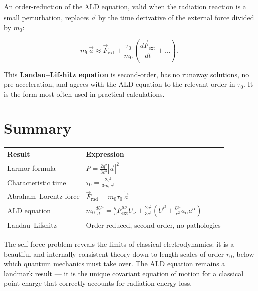 An order-reduction of the ALD equation, valid when the radiation reaction is a small perturbation, replaces $\dot{\vec{a}}$ by the time derivative of the external force divided by $m_0$:

\begin{equation}
m_0\vec{a} \approx \vec{F}_{\text{ext}} + \frac{\tau_0}{m_0}\!\left(\frac{d\vec{F}_{\text{ext}}}{dt} + \ldots\right).
\end{equation}

This \textbf{Landau--Lifshitz equation} is second-order, has no runaway solutions, no pre-acceleration, and agrees with the ALD equation to the relevant order in $\tau_0$. It is the form most often used in practical calculations.

\section{Summary}

\begin{table}[h]
\centering
\renewcommand{\arraystretch}{1.5}
\begin{tabular}{ll}
\toprule
\textbf{Result} & \textbf{Expression} \\
\midrule
Larmor formula & $P = \frac{2q^2}{3c^3}|\vec{a}|^2$ \\
Characteristic time & $\tau_0 = \frac{2q^2}{3m_0 c^3}$ \\
Abraham--Lorentz force & $\vec{F}_{\text{rad}} = m_0\tau_0\,\dot{\vec{a}}$ \\
ALD equation & $m_0\frac{dU^\mu}{d\tau} = \frac{q}{c}F^{\mu\nu}_{\text{ext}}U_\nu + \frac{2q^2}{3c^3}\!\left(\ddot{U}^\mu + \frac{U^\mu}{c^2}a_\alpha a^\alpha\right)$ \\
Landau--Lifshitz & Order-reduced, second-order, no pathologies \\
\bottomrule
\end{tabular}
\end{table}

The self-force problem reveals the limits of classical electrodynamics: it is a beautiful and internally consistent theory down to length scales of order $r_0$, below which quantum mechanics must take over. The ALD equation remains a landmark result --- it is the unique covariant equation of motion for a classical point charge that correctly accounts for radiation energy loss.
